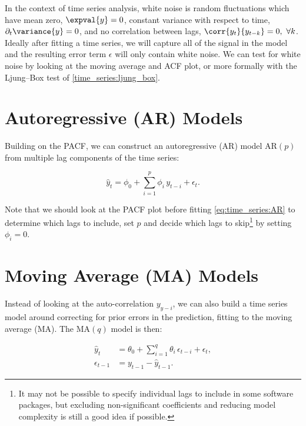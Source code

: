 In the context of time series analysis, white noise is random fluctuations which
have mean zero, $\expval{y} = 0$,
constant variance with respect to time, $\partial_{t} \variance{y} = 0$,
and no correlation between lags, $\corr{y_{t}}{y_{t-k}} = 0,\,\, \forall k$.
Ideally after fitting a time series, we will capture all of the signal
in the model and the resulting error term $\epsilon$ will only contain white noise.
We can test for white noise by looking at the moving average and ACF plot,
or more formally with the Ljung--Box test of \cref{time_series:ljung_box}.

\section{Autoregressive (AR) Models}
\label{time_series:AR}
Building on the PACF, we can construct an autoregressive (AR) model $\text{AR}\left(p\right)$
from multiple lag components of the time series:

\begin{equation}\label{eq:time_series:AR}
\hat{y}_{t} = \phi_{0} + \sum_{i=1}^{p} \phi_{i}\, y_{t-i} + \epsilon_{t}.
\end{equation}

Note that we should look at the PACF plot before fitting \cref{eq:time_series:AR}
to determine which lags to include,
\ie set $p$ and decide which lags to skip\footnote{It may not be possible
to specify individual lags to include in some software packages,
but excluding non-significant coefficients and reducing model complexity
is still a good idea if possible.} by setting $\phi_{i} = 0$.

\section{Moving Average (MA) Models}
\label{time_series:MA}

Instead of looking at the auto-correlation $y_{y-i}$,
we can also build a time series model around
correcting for prior errors in the prediction,
\ie fitting to the moving average (MA).
The $\text{MA}\left(q\right)$ model
is then:

\begin{subequations}\label{eq:time_series:MA}
\begin{align}
\hat{y}_{t} &= \theta_{0} + \sum_{i=1}^{q} \theta_{i}\, \epsilon_{t-i} + \epsilon_{t}, \label{eq:time_series:MA_y} \\
\epsilon_{t-1} &= y_{t-1} - \hat{y}_{t-1}. \label{eq:time_series:MA_epsilon}
\end{align}
\end{subequations}

